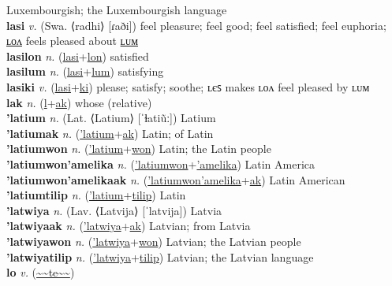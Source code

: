 Luxembourgish; the Luxembourgish language \label{'lasapuactilip} \\
\textbf{lasi} \textit{v.} (Swa. ⟨radhi⟩ [ɾaði])
feel pleasure; feel good; feel satisfied; feel euphoria; \hyperref[lasilon]{ʟᴏᴧ} feels pleased about \hyperref[lasilum]{ʟᴜᴍ} \label{lasi} \\
\textbf{lasilon} \textit{n.} (\hyperref[lasi]{lasi}+\hyperref[lon]{lon})
satisfied \label{lasilon} \\
\textbf{lasilum} \textit{n.} (\hyperref[lasi]{lasi}+\hyperref[lum]{lum})
satisfying \label{lasilum} \\
\textbf{lasiki} \textit{v.} (\hyperref[lasi]{lasi}+\hyperref[ki]{ki})
please; satisfy; soothe; ʟєꜱ makes ʟᴏᴧ feel pleased by ʟᴜᴍ \label{lasiki} \\
\textbf{lak} \textit{n.} (\hyperref[l]{l}+\hyperref[k]{ak})
whose (relative) \label{lak} \\
\textbf{'latium} \textit{n.} (Lat. ⟨Latium⟩ [ˈɫatiũː])
Latium \label{'latium} \\
\textbf{'latiumak} \textit{n.} (\hyperref['latium]{'latium}+\hyperref[ak]{ak})
Latin; of Latin \label{'latiumak} \\
\textbf{'latiumwon} \textit{n.} (\hyperref['latium]{'latium}+\hyperref[won]{won})
Latin; the Latin people \label{'latiumwon} \\
\textbf{'latiumwon'amelika} \textit{n.} (\hyperref['latiumwon]{'latiumwon}+\hyperref['amelika]{'amelika})
Latin America \label{'latiumwon'amelika} \\
\textbf{'latiumwon'amelikaak} \textit{n.} (\hyperref['latiumwon'amelika]{'latiumwon'amelika}+\hyperref[ak]{ak})
Latin American \label{'latiumwon'amelikaak} \\
\textbf{'latiumtilip} \textit{n.} (\hyperref['latium]{'latium}+\hyperref[tilip]{tilip})
Latin \label{'latiumtilip} \\
\textbf{'latwiya} \textit{n.} (Lav. ⟨Latvija⟩ [ˈlatvija])
Latvia \label{'latwiya} \\
\textbf{'latwiyaak} \textit{n.} (\hyperref['latwiya]{'latwiya}+\hyperref[ak]{ak})
Latvian; from Latvia \label{'latwiyaak} \\
\textbf{'latwiyawon} \textit{n.} (\hyperref['latwiya]{'latwiya}+\hyperref[won]{won})
Latvian; the Latvian people \label{'latwiyawon} \\
\textbf{'latwiyatilip} \textit{n.} (\hyperref['latwiya]{'latwiya}+\hyperref[tilip]{tilip})
Latvian; the Latvian language \label{'latwiyatilip} \\
\textbf{lo} \textit{v.} (\hyperref[te]{\~{}\~{}te\~{}\~{}})
